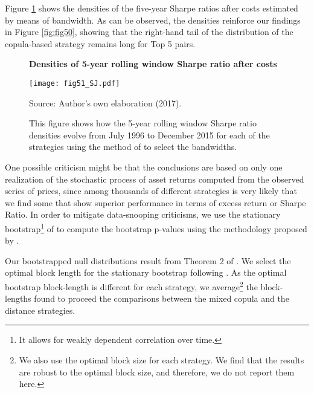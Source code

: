 \documentclass[a4paper,12pt]{report}
\begin{document}
\begin{refsection}
	\vspace{0.6cm}
	
	Figure \ref{fig:fig51} shows the densities of the five-year Sharpe ratios after costs estimated by means of \citet*{sj1991} bandwidth. As can be observed, the densities reinforce our findings in Figure \ref{fig:fig50}, showing that the right-hand tail of the distribution of the copula-based strategy remains long for Top 5 pairs.
	
	
	\begin{figure}[H]
		\centering
		\caption{\textbf{Densities of 5-year rolling window Sharpe ratio after costs}}
		\texttt{[image: fig51\_SJ.pdf]}
		\captionsetup{justification=raggedright,
			singlelinecheck=false
		}
		\caption*{Source: Author's own elaboration (2017).}
		\caption*{\scriptsize This figure shows how the 5-year rolling window Sharpe ratio densities evolve from July 1996 to December 2015 for each of the strategies using the method of \citet*{sj1991} to select the bandwidths.}
		\label{fig:fig51}
	\end{figure}
	
	One possible criticism might be that the conclusions are based on only one realization of the stochastic process of asset returns computed from the observed series of prices, since among thousands of different strategies is very likely that we find some that show superior performance in terms of excess return or Sharpe Ratio. In order to mitigate data-snooping criticisms, we use the stationary bootstrap\footnote{It allows for weakly dependent correlation over time.} of \citet*{pr94} to compute the bootstrap p-values using the methodology proposed by \citet*{lw08}. 
	
	Our bootstrapped null distributions result from Theorem 2 of \citet*{pr94}. We select the optimal block length for the stationary bootstrap following \citet*{pw04}. As the optimal bootstrap block-length is different for each strategy, we average\footnote{We also use the optimal block size for each strategy. We find that the results are robust to the optimal block size, and therefore, we do not report them here.} the block-lengths found to proceed the comparisons between the mixed copula and the distance strategies.
	

\end{refsection}
\end{document}
